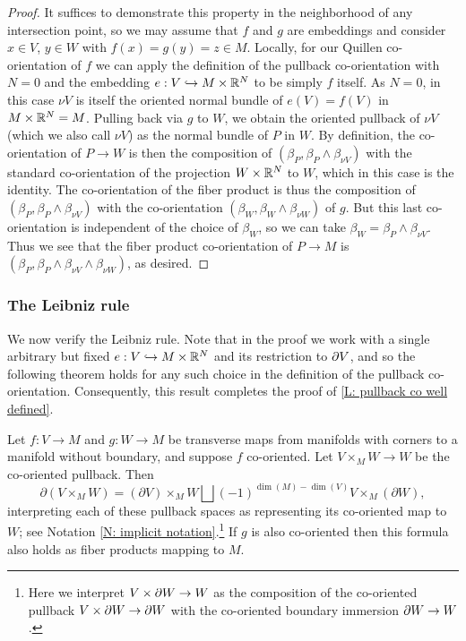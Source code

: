 \begin{proof}
	It suffices to demonstrate this property in the neighborhood of any intersection point, so we may assume that $f$ and $g$ are embeddings and consider $x\in V$, $y\in W$ with $f(x)=g(y)=z\in M$.
	Locally, for our Quillen co-orientation of $f$ we can apply the definition of the pullback co-orientation with $N=0$ and the embedding $e:V\hookrightarrow M\times \mathbb{R}^N$ to be simply $f$ itself.
	As $N=0$, in this case $\nu V$ is itself the oriented normal bundle of $e(V)=f(V)$ in $M\times \mathbb{R}^N=M$.
	Pulling back via $g$ to $W$, we obtain the oriented pullback of $\nu V$ (which we also call $\nu V$) as the normal bundle of $P$ in $W$.
	By definition, the co-orientation of $P\to W$ is then the composition of $(\beta_P,\beta_P\wedge \beta_{\nu V})$ with the standard co-orientation of the projection $W\times \mathbb{R}^N$ to $W$, which in this case is the identity.
	The co-orientation of the fiber product is thus the composition of $(\beta_P,\beta_P\wedge \beta_{\nu V})$ with the co-orientation $(\beta_W,\beta_W\wedge \beta_{\nu W})$ of $g$.
	But this last co-orientation is independent of the choice of $\beta_W$, so we can take $\beta_W=\beta_P\wedge \beta_{\nu V}$.
	Thus we see that the fiber product co-orientation of $P\to M$ is $(\beta_P, \beta_P\wedge \beta_{\nu V}\wedge \beta_{\nu W})$, as desired.
\end{proof}

\subsubsection{The Leibniz rule}

We now verify the Leibniz rule.
Note that in the proof we work with a single arbitrary but fixed $e:V\hookrightarrow M\times \mathbb{R}^N$ and its restriction to $\partial V$, and so the following theorem holds for any such choice in the definition of the pullback co-orientation.
Consequently, this result completes the proof of \cref{L: pullback co well defined}.

\begin{proposition}\label{leibniz}
	Let $f:V\to M$ and $g:W\to M$ be transverse maps from manifolds with corners to a manifold without boundary, and suppose $f$ co-oriented.
	Let $V \times_M W\to W$ be the co-oriented pullback.
	Then
	$$\partial (V \times_M W) = (\partial V) \times_M W \bigsqcup (-1)^{\dim(M)-\dim(V)} V \times_M (\partial W),$$
	interpreting each of these pullback spaces as representing its co-oriented map to $W$; see Notation \ref{N: implicit notation}.\footnote{Here we interpret $V\times\partial W\to W$ as the composition of the co-oriented pullback $V\times\partial W\to \partial W$ with the co-oriented boundary immersion $\partial W\to W$.} If $g$ is also co-oriented then this formula also holds as fiber products mapping to $M$.
\end{proposition}


